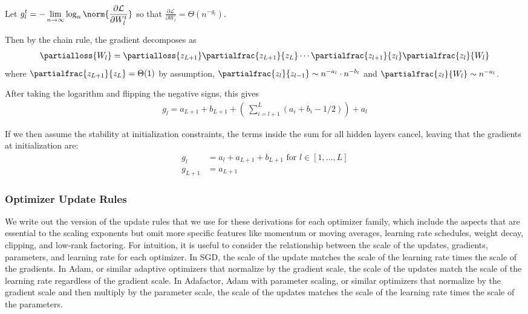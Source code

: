 \begin{appendixdef}
Let $\displaystyle g_l^t = -\lim_{n \rightarrow \infty} \log_n \norm{\frac{\partial \mathcal{L}}{\partial W_l^t}}$ so that $\frac{\partial \mathcal{L}}{\partial W_l} = \Theta(n ^ {-g_l})$.
\end{appendixdef}

Then by the chain rule, the gradient decomposes as
\begin{align*}
    \partialloss{W_l} = \partialloss{z_{L+1}} \partialfrac{z_{L+1}}{z_L} \cdots \partialfrac{z_{l+1}}{z_l} \partialfrac{z_l}{W_l}
\end{align*}
where $\partialfrac{z_{L+1}}{z_L} = \Theta(1)$ by assumption, $\partialfrac{z_{l}}{z_{l-1}} \sim n^{-a_{l}} \cdot n^{-b_{l}}$ and $\partialfrac{z_l}{W_l} \sim n^{-a_l}$.

After taking the logarithm and flipping the negative signs, this gives
\begin{align*}
    g_l = a_{L+1} + b_{L+1} + \left(\: \sum_{i = l+1} ^{L} (a_i + b_i - 1/2) \right) + a_l
\end{align*}

If we then assume the stability at initialization constraints, the terms inside the sum for all hidden layers cancel, leaving that the gradients at initialization are:
\begin{align*}
    g_l &= a_l + a_{L+1} + b_{L+1} \textrm{ for } l \in [1, \ldots, L]\\
    g_{L+1} &= a_{L+1}
\end{align*}

\subsubsection{Optimizer Update Rules}
\label{app:theory_optimizer_updates}
We write out the version of the update rules that we use for these derivations for each optimizer family, which include the aspects that are essential to the scaling exponents but omit more specific features like momentum or moving averages, learning rate schedules, weight decay, clipping, and low-rank factoring. For intuition, it is useful to consider the relationship between the scale of the updates, gradients, parameters, and learning rate for each optimizer. In SGD, the scale of the update matches the scale of the learning rate times the scale of the gradients. In Adam, or similar adaptive optimizers that normalize by the gradient scale, the scale of the updates match the scale of the learning rate regardless of the gradient scale. In Adafactor, Adam with parameter scaling, or similar optimizers that normalize by the gradient scale and then multiply by the parameter scale, the scale of the updates matches the scale of the learning rate times the scale of the parameters.

